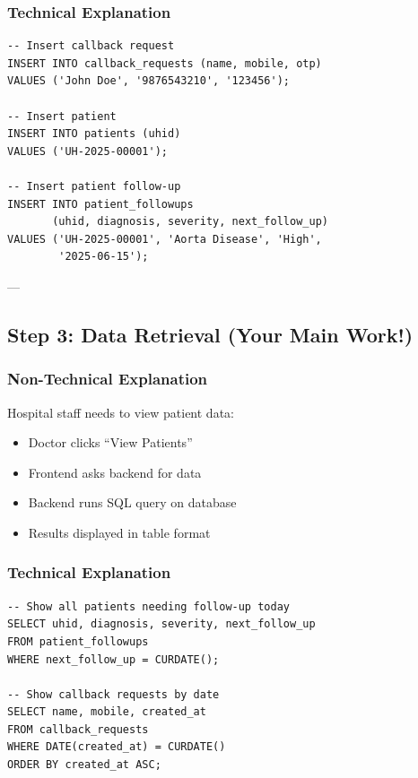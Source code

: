 \documentclass[12pt,a4paper]{article}
\begin{document}
\subsubsection{Technical Explanation}

\begin{lstlisting}[caption={Inserting Data (Backend calls this)}]
-- Insert callback request
INSERT INTO callback_requests (name, mobile, otp)
VALUES ('John Doe', '9876543210', '123456');

-- Insert patient
INSERT INTO patients (uhid)
VALUES ('UH-2025-00001');

-- Insert patient follow-up
INSERT INTO patient_followups 
       (uhid, diagnosis, severity, next_follow_up)
VALUES ('UH-2025-00001', 'Aorta Disease', 'High', 
        '2025-06-15');
\end{lstlisting}

---

\subsection{Step 3: Data Retrieval (Your Main Work!)}

\subsubsection{Non-Technical Explanation}

Hospital staff needs to view patient data:

\begin{itemize}
    \item Doctor clicks ``View Patients''
    \item Frontend asks backend for data
    \item Backend runs SQL query on database
    \item Results displayed in table format
\end{itemize}

\subsubsection{Technical Explanation}

\begin{lstlisting}[caption={Retrieving Data (Your SQL Queries)}]
-- Show all patients needing follow-up today
SELECT uhid, diagnosis, severity, next_follow_up
FROM patient_followups
WHERE next_follow_up = CURDATE();

-- Show callback requests by date
SELECT name, mobile, created_at
FROM callback_requests
WHERE DATE(created_at) = CURDATE()
ORDER BY created_at ASC;
\end{lstlisting}
\end{document}

